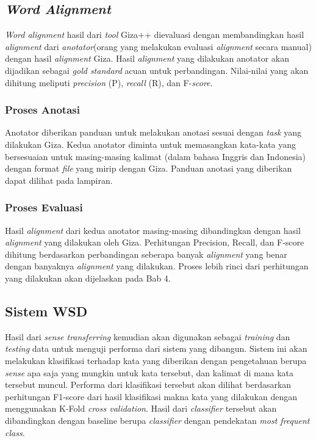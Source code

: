 \subsection{\textit{Word Alignment}}
\textit{Word alignment} hasil dari \textit{tool} Giza++ dievaluasi dengan membandingkan hasil \textit{alignment} dari \textit{anotator}(orang yang melakukan evaluasi \textit{alignment} secara manual) dengan hasil \textit{alignment} Giza. Hasil \textit{alignment} yang dilakukan anotator akan dijadikan sebagai \textit{gold standard} acuan untuk perbandingan. Nilai-nilai yang akan dihitung meliputi \textit{precision} (P), \textit{recall} (R), dan F-\textit{score}. 

\subsubsection{Proses Anotasi}

Anotator diberikan panduan untuk melakukan anotasi sesuai dengan \textit{task} yang dilakukan Giza. Kedua anotator diminta untuk memasangkan kata-kata yang bersesuaian untuk masing-masing kalimat (dalam bahasa Inggris dan Indonesia) dengan format \textit{file} yang mirip dengan Giza. Panduan anotasi yang diberikan dapat dilihat pada lampiran.

\subsubsection{Proses Evaluasi}

Hasil \textit{alignment} dari kedua anotator masing-masing dibandingkan dengan hasil \textit{alignment} yang dilakukan oleh Giza. Perhitungan Precision, Recall, dan F-score dihitung berdasarkan perbandingan seberapa banyak \textit{alignment} yang benar dengan banyaknya \textit{alignment} yang dilakukan. Proses lebih rinci dari perhitungan yang dilakukan akan dijelaskan pada Bab 4.

\subsection{Sistem WSD}
Hasil dari \textit{sense transferring} kemudian akan digunakan sebagai \textit{training} dan \textit{testing} data untuk menguji performa dari sistem yang dibangun. 
Sistem ini akan melakukan klasifikasi terhadap kata yang diberikan dengan pengetahuan berupa \textit{sense} apa saja yang mungkin untuk kata tersebut, dan kalimat di mana kata tersebut muncul. Performa dari klasifikasi tersebut akan dilihat berdasarkan perhitungan F1-score dari hasil klasifikasi makna kata yang dilakukan dengan menggunakan K-Fold \textit{cross validation}. Hasil dari \textit{classifier} tersebut akan dibandingkan dengan baseline berupa \textit{classifier} dengan pendekatan \textit{most frequent class}.